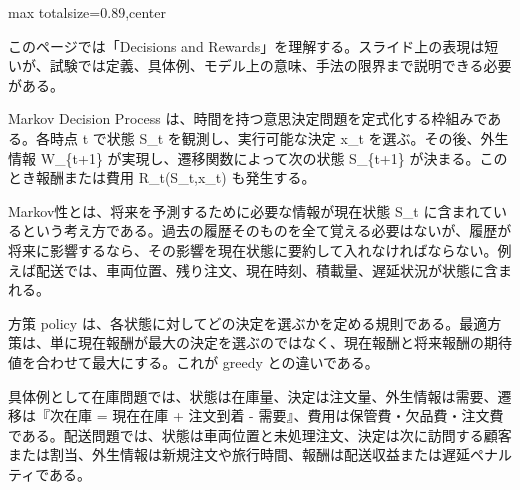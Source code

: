 \begin{minipage}[t]{0.58\textwidth}
\begin{adjustbox}{max totalsize={\textwidth}{0.89\textheight},center}
\begin{minipage}{\textwidth}\scriptsize
{}このページでは「Decisions and Rewards」を理解する。スライド上の表現は短いが、試験では定義、具体例、モデル上の意味、手法の限界まで説明できる必要がある。\par
Markov Decision Process は、時間を持つ意思決定問題を定式化する枠組みである。各時点 t で状態 S\_t を観測し、実行可能な決定 x\_t を選ぶ。その後、外生情報 W\_\{t+1\} が実現し、遷移関数によって次の状態 S\_\{t+1\} が決まる。このとき報酬または費用 R\_t(S\_t,x\_t) も発生する。\par
Markov性とは、将来を予測するために必要な情報が現在状態 S\_t に含まれているという考え方である。過去の履歴そのものを全て覚える必要はないが、履歴が将来に影響するなら、その影響を現在状態に要約して入れなければならない。例えば配送では、車両位置、残り注文、現在時刻、積載量、遅延状況が状態に含まれる。\par
方策 policy は、各状態に対してどの決定を選ぶかを定める規則である。最適方策は、単に現在報酬が最大の決定を選ぶのではなく、現在報酬と将来報酬の期待値を合わせて最大にする。これが greedy との違いである。\par
具体例として在庫問題では、状態は在庫量、決定は注文量、外生情報は需要、遷移は『次在庫 = 現在在庫 + 注文到着 - 需要』、費用は保管費・欠品費・注文費である。配送問題では、状態は車両位置と未処理注文、決定は次に訪問する顧客または割当、外生情報は新規注文や旅行時間、報酬は配送収益または遅延ペナルティである。\par

\end{minipage}
\end{adjustbox}
\end{minipage}

